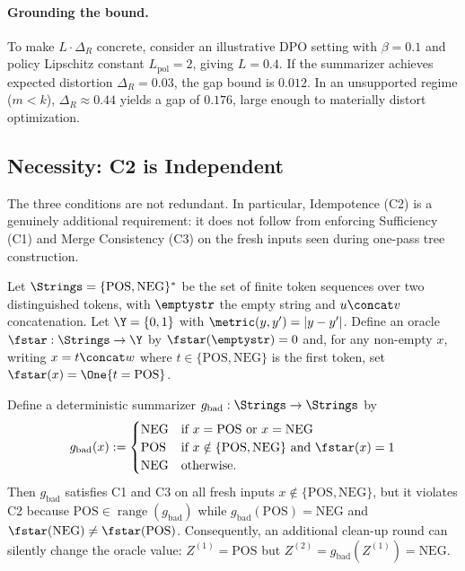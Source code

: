 \paragraph{Grounding the bound.}
To make $L \cdot \Delta_R$ concrete, consider an illustrative DPO setting with $\beta = 0.1$ and policy Lipschitz constant $L_{\mathrm{pol}} = 2$, giving $L = 0.4$. If the summarizer achieves expected distortion $\Delta_R = 0.03$, the gap bound is $0.012$. In an unsupported regime ($m < k$), $\Delta_R \approx 0.44$ yields a gap of $0.176$, large enough to materially distort optimization.

\subsection{Necessity: C2 is Independent}

The three conditions are not redundant. In particular, Idempotence (C2) is a genuinely additional requirement: it does not follow from enforcing Sufficiency (C1) and Merge Consistency (C3) on the fresh inputs seen during one-pass tree construction.

\begin{example}\label{ex:c2-independent}
Let $\Strings = \{\text{POS}, \text{NEG}\}^\ast$ be the set of finite token sequences over two distinguished tokens, with $\emptystr$ the empty string and $u \concat v$ concatenation. Let $\Y = \{0,1\}$ with $\metric(y,y') = |y-y'|$. Define an oracle $\fstar:\Strings\to\Y$ by $\fstar(\emptystr)=0$ and, for any non-empty $x$, writing $x = t \concat w$ where $t \in \{\text{POS},\text{NEG}\}$ is the first token, set $\fstar(x)=\One\{t=\text{POS}\}$.

Define a deterministic summarizer $g_{\mathrm{bad}}:\Strings\to\Strings$ by
\[
g_{\mathrm{bad}}(x) :=
\begin{cases}
\text{NEG} & \text{if } x=\text{POS} \text{ or } x=\text{NEG} \\
\text{POS} & \text{if } x \notin \{\text{POS},\text{NEG}\} \text{ and } \fstar(x)=1 \\
\text{NEG} & \text{otherwise.}
\end{cases}
\]
Then $g_{\mathrm{bad}}$ satisfies C1 and C3 on all fresh inputs $x \notin \{\text{POS},\text{NEG}\}$, but it violates C2 because $\text{POS}\in\operatorname{range}(g_{\mathrm{bad}})$ while $g_{\mathrm{bad}}(\text{POS})=\text{NEG}$ and $\fstar(\text{NEG})\neq\fstar(\text{POS})$. Consequently, an additional clean-up round can silently change the oracle value: $Z^{(1)}=\text{POS}$ but $Z^{(2)}=g_{\mathrm{bad}}(Z^{(1)})=\text{NEG}$.
\end{example}

